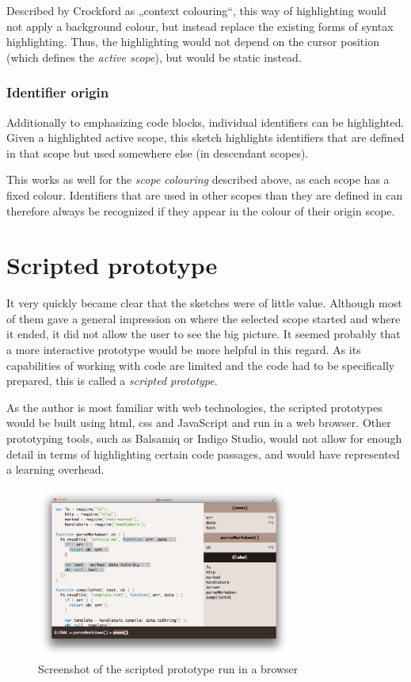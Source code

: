 Described by Crockford \citeyear{crockford} as „context colouring“, this
way of highlighting would not apply a background colour, but instead
replace the existing forms of syntax highlighting. Thus, the
highlighting would not depend on the cursor position (which defines the
\emph{active scope}), but would be static instead.

\subsubsection{Identifier origin}\label{identifier-origin}

Additionally to emphasizing code blocks, individual identifiers can be
highlighted. Given a highlighted active scope, this sketch highlights
identifiers that are defined in that scope but used somewhere else (in
descendant scopes).

This works as well for the \emph{scope colouring} described above, as
each scope has a fixed colour. Identifiers that are used in other scopes
than they are defined in can therefore always be recognized if they
appear in the colour of their origin scope.

\section{Scripted prototype}\label{scripted-prototype}

It very quickly became clear that the sketches were of little value.
Although most of them gave a general impression on where the selected
scope started and where it ended, it did not allow the user to see the
big picture. It seemed probably that a more interactive prototype would
be more helpful in this regard. As its capabilities of working with code
are limited and the code had to be specifically prepared, this is called
a \emph{scripted prototype}.

As the author is most familiar with web technologies, the scripted
prototypes would be built using \ac{html}, \ac{css} and JavaScript and
run in a web browser. Other prototyping tools, such as Balsamiq or
Indigo Studio, would not allow for enough detail in terms of
highlighting certain code passages, and would have represented a
learning overhead.

\begin{figure}[htbp]
\centering
\includegraphics[keepaspectratio,width=0.75\textwidth,height=0.75\textheight]{img/prototype-1.png}
\caption{Screenshot of the scripted prototype run in a browser}
\label{fig:syntaxhighlighting}
\end{figure}

